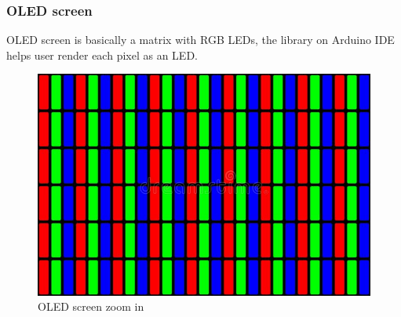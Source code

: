 \documentclass[12pt]{article}
\begin{document}
        \subsubsection{OLED screen}
            OLED screen is basically a matrix with RGB LEDs, the library on Arduino IDE helps user render each pixel as an LED.
            \begin{figure}[!h]
                \centering
                \includegraphics[scale = 1]{./images/OLED.jpg}
                \caption{OLED screen zoom in}
                \label{fig:OLED}
            \end{figure}
\end{document}
